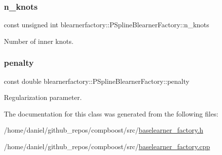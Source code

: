 \subsubsection{\texorpdfstring{n\+\_\+knots}{n\_knots}}
{\footnotesize\ttfamily const unsigned int blearnerfactory\+::\+P\+Spline\+Blearner\+Factory\+::n\+\_\+knots\hspace{0.3cm}{\ttfamily [private]}}



Number of inner knots. 

\mbox{\label{classblearnerfactory_1_1_p_spline_blearner_factory_ae5bfe83b154898ad6cff26d56a82f540}} 
\subsubsection{\texorpdfstring{penalty}{penalty}}
{\footnotesize\ttfamily const double blearnerfactory\+::\+P\+Spline\+Blearner\+Factory\+::penalty\hspace{0.3cm}{\ttfamily [private]}}



Regularization parameter. 



The documentation for this class was generated from the following files\+:\begin{DoxyCompactItemize}
\item 
/home/daniel/github\+\_\+repos/compboost/src/\hyperlink{baselearner__factory_8h}{baselearner\+\_\+factory.\+h}\item 
/home/daniel/github\+\_\+repos/compboost/src/\hyperlink{baselearner__factory_8cpp}{baselearner\+\_\+factory.\+cpp}\end{DoxyCompactItemize}
